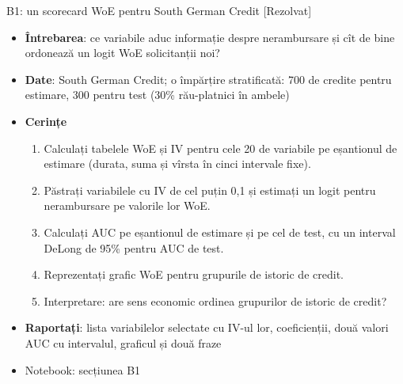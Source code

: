 \begin{frame}{B1: un scorecard WoE pentru South German Credit [Rezolvat]}
\itemsize{\footnotesize}
\begin{itemize}
\item \textbf{Întrebarea}: ce variabile aduc informație despre nerambursare și cît de bine ordonează un logit WoE solicitanții noi?
\item \textbf{Date}: South German Credit; o împărțire stratificată: 700 de credite pentru estimare, 300 pentru test (30\% rău-platnici în ambele)
\item \textbf{Cerințe}
\begin{enumerate}
    \item Calculați tabelele WoE și IV pentru cele 20 de variabile pe eșantionul de estimare (durata, suma și vîrsta în cinci intervale fixe).
    \item Păstrați variabilele cu IV de cel puțin 0,1 și estimați un logit pentru nerambursare pe valorile lor WoE.
    \item Calculați AUC pe eșantionul de estimare și pe cel de test, cu un interval DeLong de 95\% pentru AUC de test.
    \item Reprezentați grafic WoE pentru grupurile de istoric de credit.
    \item Interpretare: are sens economic ordinea grupurilor de istoric de credit?
\end{enumerate}
\item \textbf{Raportați}: lista variabilelor selectate cu IV-ul lor, coeficienții, două valori AUC cu intervalul, graficul și două fraze
\item Notebook: secțiunea B1
\end{itemize}
\end{frame}

